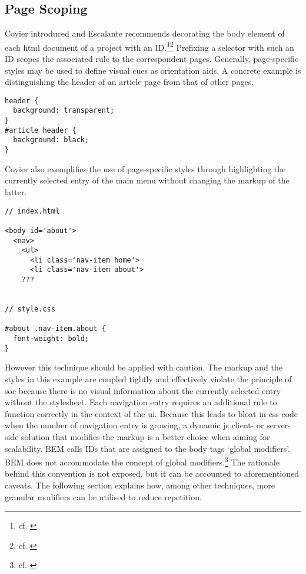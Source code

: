 \subsection{Page Scoping}
Coyier introduced and Escalante recommends decorating the body element of each \gls{html} document of a project with an ID.\footnote{cf. \cite{coyieridbody}}\footnote{cf. \cite{mpgcss}}
Prefixing a selector with such an ID scopes the associated rule to the correspondent pages.
Generally, page-specific styles may be used to define visual cues as orientation aids.
A concrete example is distinguishing the header of an article page from that of other pages.

\begin{lstlisting}
header {
  background: transparent;
}
#article header {
  background: black;
}
\end{lstlisting}

Coyier also exemplifies the use of page-specific styles through highlighting the currently selected entry of the main menu without changing the markup of the latter.

\pagebreak
{}
\begin{lstlisting}
// index.html

<body id='about'>
  <nav>
    <ul>
      <li class='nav-item home'>
      <li class='nav-item about'>
    ???


// style.css

#about .nav-item.about {
  font-weight: bold;
}

\end{lstlisting}

However this technique should be applied with caution.
The markup and the styles in this example are coupled tightly and effectively violate the principle of \gls{soc} because there is no visual information about the currently selected entry without the stylesheet.
Each navigation entry requires an additional rule to function correctly in the context of the \gls{ui}.
Because this leads to bloat in \gls{css} code when the number of navigation entry is growing, a dynamic \gls{js} client- or server-side solution that modifies the markup is a better choice when aiming for scalability.
BEM calls IDs that are assigned to the body tags `global modifiers'.
BEM does not accommodate the concept of global modifiers.\footnote{cf. \cite{bemfaq}}
The rationale behind this convention is not exposed, but it can be accounted to aforementioned caveats.
The following section explains how, among other techniques, more granular modifiers can be utilised to reduce repetition.
